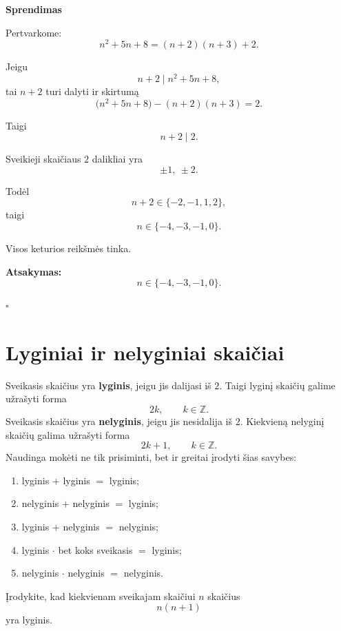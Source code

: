 \documentclass[11pt,a4paper]{scrartcl}
\newenvironment{solution}
    {\begin{list}{}{\setlength{\leftmargin}{10pt}\setlength{\rightmargin}{10pt}}\item[]}
    {\end{list}}
\begin{document}
\begin{solution}
\textbf{Sprendimas}

Pertvarkome:
\[
n^2+5n+8=(n+2)(n+3)+2.
\]

Jeigu
\[
n+2\mid n^2+5n+8,
\]
tai $n+2$ turi dalyti ir skirtumą
\[
\bigl(n^2+5n+8\bigr)-(n+2)(n+3)=2.
\]

Taigi
\[
n+2\mid 2.
\]

Sveikieji skaičiaus $2$ dalikliai yra
\[
\pm1,\ \pm2.
\]

Todėl
\[
n+2\in\{-2,-1,1,2\},
\]
taigi
\[
n\in\{-4,-3,-1,0\}.
\]

Visos keturios reikšmės tinka.

\textbf{Atsakymas:}
\[
\boxed{n\in\{-4,-3,-1,0\}}.
\]

\hfill $\square$

\end{solution}

\section{Lyginiai ir nelyginiai skaičiai}

Sveikasis skaičius yra \textbf{lyginis}, jeigu jis dalijasi iš $2$. Taigi lyginį skaičių galime užrašyti forma
\[
2k,
\qquad k\in\mathbb Z.
\]
Sveikasis skaičius yra \textbf{nelyginis}, jeigu jis nesidalija iš $2$.
Kiekvieną nelyginį skaičių galima užrašyti forma
\[
2k+1,
\qquad k\in\mathbb Z.
\]
Naudinga mokėti ne tik prisiminti, bet ir greitai įrodyti šias savybes:

\begin{enumerate}
    \renewcommand{\labelenumi}{\textbf{\theenumi.}}

    \item lyginis $+$ lyginis $=$ lyginis;
    \item nelyginis $+$ nelyginis $=$ lyginis;
    \item lyginis $+$ nelyginis $=$ nelyginis;
    \item lyginis $\cdot$ bet koks sveikasis $=$ lyginis;
    \item nelyginis $\cdot$ nelyginis $=$ nelyginis.
\end{enumerate}

\begin{example}

Įrodykite, kad kiekvienam sveikajam skaičiui $n$ skaičius
\[
n(n+1)
\]
yra lyginis.

\end{example}
\end{document}
